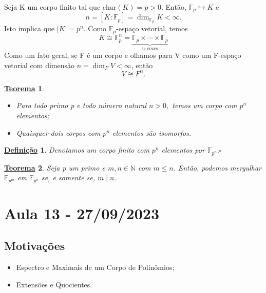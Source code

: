 \documentclass{article}
\newtheorem*{def*}{\underline{Defini\c c\~ao}}
\newtheorem*{theorem*}{\underline{Teorema}}
\begin{document}
    Seja K um corpo finito tal que \(\mathrm{char}(K) = p > 0.\) Então, \(\mathbb{F}_{p}\hookrightarrow K\) e 
    \[
      n = [K:\mathbb{F}_{p}] = \dim_{\mathbb{F}_{p}}K < \infty.
    \]
    Isto implica que \(|K| = p^{n}\). Como \(\mathbb{F}_{p}\)-espaço vetorial, temos 
    \[
      K\cong{\mathbb{F}_{p}^{n}} = \underbrace{\mathbb{F}_{p}\times \cdots\times \mathbb{F}_{p}}_{\text{n-vezes}}
    \]
    Como um fato geral, se F é um corpo e olhamos para V como um F-espaço vetorial com dimensão \(n = \dim_{F}V < \infty\), então 
    \[
      V\cong{F^{n}}.
    \]
    \begin{theorem*}
      \begin{itemize}
        \item[1)] Para todo primo p e todo número natural \(n > 0,\) temos um corpo com \(p^{n}\) elementos;
        \item[2)] Quaisquer dois corpos com \(p^{n}\) elementos são isomorfos.
      \end{itemize}
    \end{theorem*}
    \begin{def*}
      Denotamos um corpo finito com \(p^{n}\) elementos por \(\mathbb{F}_{p^{n}}.\square\)
    \end{def*}
    \begin{theorem*}
      Seja p um primo e \(m, n\in \mathbb{N}\) com \(m\leq n.\) Então, podemos mergulhar \(\mathbb{F}_{p^{m}}\) em \(\mathbb{F}_{p^{n}}\) se, e somente se, \(m\mid n.\)
    \end{theorem*}
    \newpage

    \section{Aula 13 - 27/09/2023}
    \subsection{Motivações}
    \begin{itemize}
      \item Espectro e Maximais de um Corpo de Polinômios;
      \item Extensões e Quocientes.
    \end{itemize}
\end{document}
